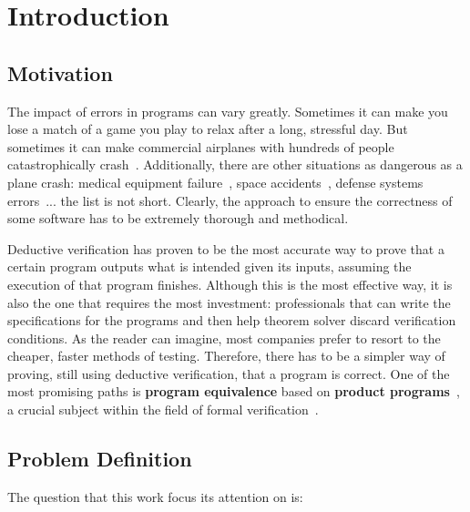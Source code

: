 
%

\chapter{Introduction}
\label{cha:introduction}

\section{Motivation} 

The impact of errors in programs can vary greatly.
Sometimes it can make you lose a match of a game you play to relax after a long, stressful day.
But sometimes it can make commercial airplanes with hundreds of people catastrophically crash~\cite{air-india}.
Additionally, there are other situations as dangerous as a plane crash: medical equipment failure~\cite{therac-25}, space accidents~\cite{ariane}, defense systems errors~\cite{patriot}... the list is not short.
Clearly, the approach to ensure the correctness of some software has to be extremely thorough and methodical.

Deductive verification has proven to be the most accurate way to prove that a certain program outputs what is intended given its inputs, assuming the execution of that program finishes.
Although this is the most effective way, it is also the one that requires the most investment: professionals that can write the specifications for the programs and then help theorem solver discard verification conditions.
As the reader can imagine, most companies prefer to resort to the cheaper, faster methods of testing.
Therefore, there has to be a simpler way of proving, still using deductive verification, that a program is correct.
One of the most promising paths is \textbf{program equivalence} based on \textbf{product programs}~\cite{DBLP:conf/fm/BartheCK11}, a crucial subject within the field of formal verification~\cite{DBLP:journals/fmsd/Strichman18}.


\section{Problem Definition}

The question that this work focus its attention on is:

